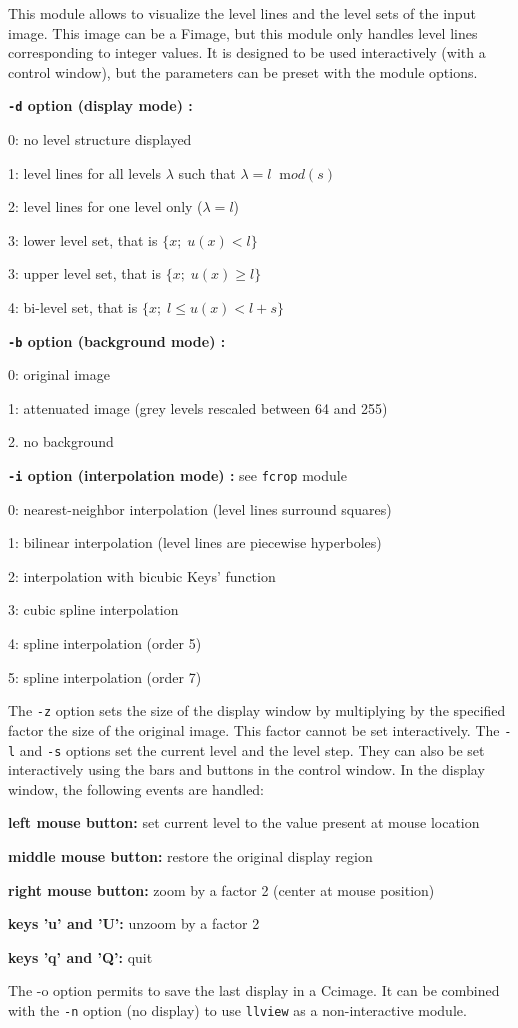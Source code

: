 This module allows to visualize the level lines and the level sets of
the input image. This image can be a Fimage, but this module only handles 
level lines corresponding to integer values.
It is designed to be used interactively (with a control
window), but the parameters can be preset with the module options.

\medskip

{\bf \verb+-d+ option (display mode) :}

0: no level structure displayed

1: level lines for all levels $\lambda$ such that $\lambda = l \;\;{\mathrm mod}(s)$

2: level lines for one level only ($\lambda=l$)

3: lower level set, that is $\{x;\; u(x)<l\}$

3: upper level set, that is $\{x;\; u(x)\geq l\}$

4: bi-level set, that is $\{x;\; l \leq u(x)<l+s\}$

\medskip

{\bf \verb+-b+ option (background mode) :}

0: original image

1: attenuated image (grey levels rescaled between 64 and 255)

2. no background

\medskip

{\bf \verb+-i+ option (interpolation mode) :} see \verb+fcrop+ module

0: nearest-neighbor interpolation (level lines surround squares)

1: bilinear interpolation (level lines are piecewise hyperboles)

2: interpolation with bicubic Keys' function 

3: cubic spline interpolation

4: spline interpolation (order 5)

5: spline interpolation (order 7)

\medskip

The \verb+-z+ option sets the size of the display window by multiplying
by the specified factor the size of the original image. This factor
cannot be set interactively. The \verb+-l+ and \verb+-s+ options 
set the current level and the level step. They can also be set interactively
using the bars and buttons in the control window. In the display window,
the following events are handled:

\medskip

{\bf left mouse button:} set current level to the value present at mouse location

{\bf middle mouse button:} restore the original display region

{\bf right mouse button:} zoom by a factor 2 (center at mouse position)

{\bf keys 'u' and 'U':} unzoom by a factor 2

{\bf keys 'q' and 'Q':} quit 

\medskip

The -o option permits to save the last display in a Ccimage.
It can be combined with the \verb+-n+ option (no display) to
use \verb+llview+ as a non-interactive module.


